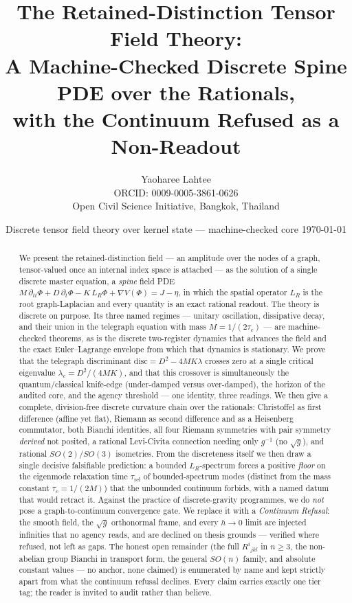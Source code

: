 \documentclass[10pt,twocolumn]{article}
\title{\bfseries The Retained-Distinction Tensor Field Theory:\\
A Machine-Checked Discrete Spine PDE over the Rationals,\\
with the Continuum Refused as a Non-Readout}
\author{Yaoharee Lahtee\\[2pt]
\small ORCID: 0009-0005-3861-0626\\
\small Open Civil Science Initiative, Bangkok, Thailand}
\date{\small Discrete tensor field theory over kernel state --- machine-checked core
\;\textbullet\; \today}
\theoremstyle{definition}
\newcommand{\LR}{L_{R}}
\begin{document}
\maketitle
\thispagestyle{preprintfirst}

\begin{abstract}
\noindent
We present the retained-distinction field --- an amplitude over the nodes of a graph,
tensor-valued once an internal index space is attached --- as the solution of a single
discrete master equation, a \emph{spine} field PDE
$M\,\partial_{tt}\Phi + D\,\partial_{t}\Phi - K\,\LR\Phi + \nabla V(\Phi) = J-\eta$,
in which the spatial operator $\LR$ is the root graph-Laplacian and every quantity is an
exact rational readout. The theory is discrete on purpose. Its three named regimes ---
unitary oscillation, dissipative decay, and their union in the telegraph equation with
mass $M=1/(2\tau_c)$ --- are machine-checked theorems, as is the discrete two-register
dynamics that advances the field and the exact Euler--Lagrange envelope from which that
dynamics is stationary. We prove that the telegraph discriminant
$\mathrm{disc}=D^2-4MK\lambda$ crosses zero at a single critical eigenvalue
$\lambda_c=D^2/(4MK)$, and that this crossover is simultaneously the quantum/classical
knife-edge (under-damped versus over-damped), the horizon of the audited core, and the
agency threshold --- one identity, three readings. We then give a complete, division-free
discrete curvature chain over the rationals: Christoffel as first difference (affine yet
flat), Riemann as second difference and as a Heisenberg commutator, both Bianchi
identities, all four Riemann symmetries with pair symmetry \emph{derived} not posited, a
rational Levi-Civita connection needing only $g^{-1}$ (no $\sqrt{g}$), and rational
$SO(2)/SO(3)$ isometries. From the discreteness itself we then draw a single decisive
falsifiable prediction: a bounded $\LR$-spectrum forces a positive \emph{floor} on the
eigenmode relaxation time $\tau_{\mathrm{rel}}$ of bounded-spectrum modes (distinct from the
mass constant $\tau_c=1/(2M)$) that the unbounded continuum forbids, with a named datum that
would retract it. Against the practice of discrete-gravity programmes, we do
\emph{not} pose a graph-to-continuum convergence gate. We replace it with a
\emph{Continuum Refusal}: the smooth field, the $\sqrt{g}$ orthonormal frame, and every
$h\!\to\!0$ limit are injected infinities that no agency reads, and are declined on thesis
grounds --- verified where refused, not left as gaps. The honest open remainder (the full
$R^{i}{}_{jkl}$ in $n\ge 3$, the non-abelian group Bianchi in transport form, the general
$SO(n)$ family, and absolute constant values --- no anchor, none claimed) is enumerated by
name and kept strictly apart from what the continuum refusal declines. Every claim carries
exactly one tier tag; the reader is invited to audit rather than believe.
\end{abstract}
\end{document}
